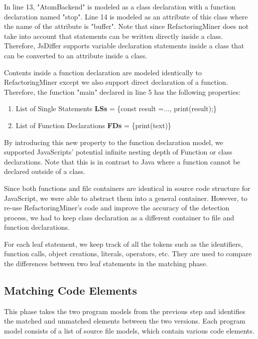 \documentclass[letterpaper,12pt,onecolumn,final]{report}
\begin{document}
In line 13, "AtomBackend" is modeled as a class declaration with a function declaration named "stop". Line 14 is modeled as an attribute of this class where the name of the attribute is "buffer". Note that since RefactoringMiner does not take into account that statements can be written directly inside a class. Therefore, JsDiffer supports variable declaration statements inside a class that can be converted to an attribute inside a class.

Contents inside a function declaration are modeled identically to RefactoringMiner except we also support direct declaration of a function. Therefore, the function "main" declared in line 5 has the following properties:

\begin{enumerate}
\item List of Single Statements \textbf{LSs} = \{const result =..., print(result);\}
\item List of Function Declarations \textbf{FDs} = \{print(text)\}
\end{enumerate}


By introducing this new property to the function declaration model, we supported JavaScripts' potential infinite nesting depth of Function or class declarations. Note that this is in contrast to Java where a function cannot be declared outside of a class.

Since both functions and file containers are identical in source code structure for JavaScript, we were able to abstract them into a general container. However, to re-use RefactoringMiner's code and improve the accuracy of the detection process, we had to keep class declaration as a different container to file and function declarations.

For each leaf statement, we keep track of all the tokens such as the identifiers, function calls, object creations, literals, operators, etc. They are used to compare the differences between two leaf statements in the matching phase.

\subsection {Matching Code Elements}
This phase takes the two program models from the previous step and identifies the matched and unmatched elements between the two versions. Each program model consists of a list of source file models, which contain various code elements.
\end{document}
